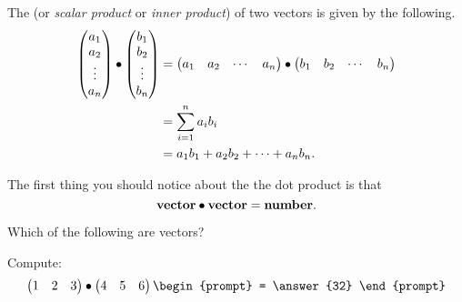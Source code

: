 \documentclass{ximera}
\begin{document}
 \begin{definition}
   The  (or \textit{scalar product} or \textit{inner
     product}) of two vectors is given by the following.
   \begin{align*}
     \begin{pmatrix}
       a_1\\
       a_2\\
       \vdots\\
       a_n
     \end{pmatrix}
     \bullet
     \begin{pmatrix}
       b_1\\
       b_2\\
       \vdots\\
       b_n
     \end{pmatrix}
     &=\begin{pmatrix} a_1 & a_2 & \cdots & a_n\end{pmatrix}\bullet\begin{pmatrix} b_1 & b_2 & \cdots & b_n\end{pmatrix}\\
     &= \sum_{i=1}^n a_ib_i\\
     &= a_1b_1 + a_2b_2 +\dots+a_nb_n.
   \end{align*}
 \end{definition}

The first thing you should notice about the the dot product is that
\[
\mathbf{vector}\bullet \mathbf{vector} = \mathbf{number}.
\]


\begin{question}
  Which of the following are vectors?
  \begin{selectAll}
    \pdfOnly{\end{multicols}}
    \end{selectAll}
\end{question}


\begin{question}
  Compute:
  \[
  \begin{pmatrix}1 & 2 & 3\end{pmatrix}\dotp\begin{pmatrix}4 & 5 & 6\end{pmatrix}
  \begin{prompt}
    = \answer{32}
  \end{prompt}
  \]
\end{question}
\end{document}
